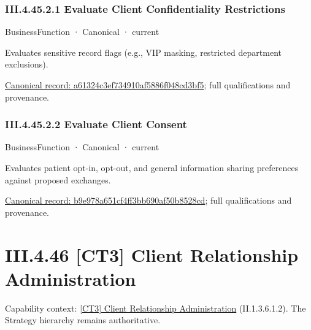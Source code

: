 \subsubsection*{III.4.45.2.1 Evaluate Client Confidentiality Restrictions}
\label{navigation:III.4.45.2.1}

\label{element:a61324c3ef734910af5886f048cd3bf5}
{\small BusinessFunction · Canonical · current}\par

Evaluates sensitive record flags (e.g., VIP masking, restricted department exclusions).


{\footnotesize \href{../../../../continuum/business/business-function/a61324c3ef734910af5886f048cd3bf5.md}{Canonical record: a61324c3ef734910af5886f048cd3bf5}; full qualifications and provenance.}\par
\subsubsection*{III.4.45.2.2 Evaluate Client Consent}
\label{navigation:III.4.45.2.2}

\label{element:b9e978a651cf4ff3bb690af50b8528cd}
{\small BusinessFunction · Canonical · current}\par

Evaluates patient opt-in, opt-out, and general information sharing preferences against proposed exchanges.


{\footnotesize \href{../../../../continuum/business/business-function/b9e978a651cf4ff3bb690af50b8528cd.md}{Canonical record: b9e978a651cf4ff3bb690af50b8528cd}; full qualifications and provenance.}\par
\section*{III.4.46 [CT3] Client Relationship Administration}
\label{navigation:III.4.46}

{\small Capability context: \hyperref[element:d682c11d3eb04770b1f20be478fd475e]{[CT3] Client Relationship Administration} (II.1.3.6.1.2). The Strategy hierarchy remains authoritative.}\par
